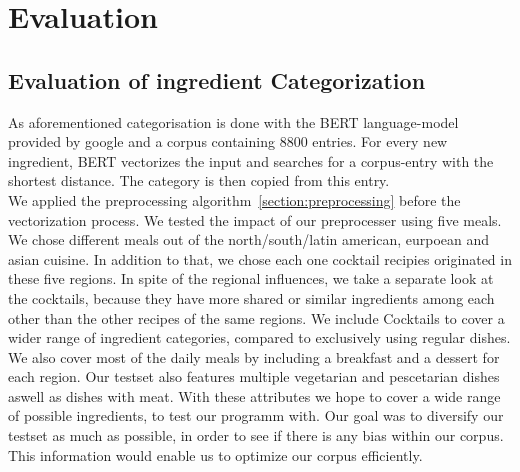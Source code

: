 
\chapter{Evaluation}\label{chapter:Evaluation}
\section{Evaluation of ingredient Categorization}\label{sec:eval_cat}
As aforementioned categorisation is done with the BERT language-model provided by google and a corpus containing 8800 entries. For every new ingredient, BERT vectorizes the input and searches for a corpus-entry with the shortest distance.
The category is then copied from this entry.\\
We applied the preprocessing algorithm~\ref{section:preprocessing} before the vectorization process. We tested the impact of our preprocesser using five meals. We chose different meals out of the north/south/latin american, eurpoean and asian cuisine. In addition to that, we chose each one cocktail recipies originated in these five regions. In spite of the regional influences, we take a separate look at the cocktails, because they have more shared or similar ingredients among each other than the other recipes of the same regions. We include Cocktails to cover a wider range of ingredient categories, compared to exclusively using regular dishes. We also cover most of the daily meals by including a breakfast and a dessert for each region. Our testset also features multiple vegetarian and pescetarian dishes aswell as dishes with meat. With these attributes we hope to cover a wide range of possible ingredients, to test our programm with. Our goal was to diversify our testset as much as possible, in order to see if there is any bias within our corpus. This information would enable us to optimize our corpus efficiently. \\
